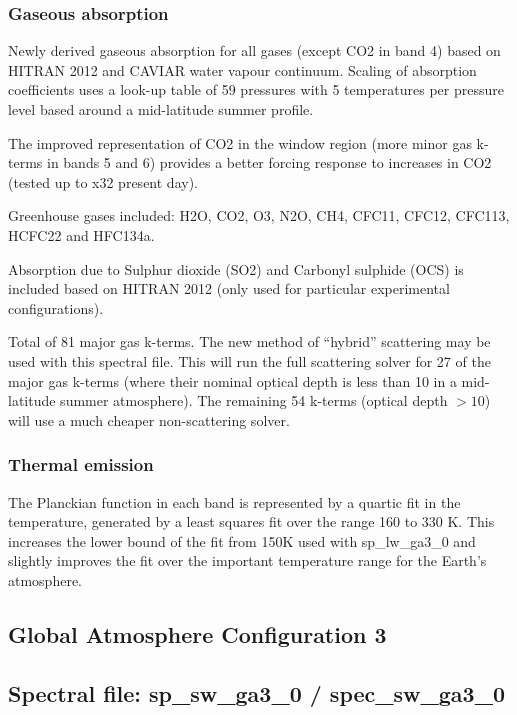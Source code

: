 \subsubsection*{Gaseous absorption}

Newly derived gaseous absorption for all gases (except CO2 in band 4) based on HITRAN 2012 and CAVIAR water vapour continuum. Scaling of absorption coefficients uses a look-up table of 59 pressures with 5 temperatures per pressure level based around a mid-latitude summer profile.

The improved representation of CO2 in the window region (more minor gas k-terms in bands 5 and 6) provides a better forcing response to increases in CO2 (tested up to x32 present day).

Greenhouse gases included: H2O, CO2, O3, N2O, CH4, CFC11, CFC12, CFC113, HCFC22 and HFC134a.

Absorption due to Sulphur dioxide (SO2) and Carbonyl sulphide (OCS) is included based on HITRAN 2012 (only used for particular experimental configurations).

Total of 81 major gas k-terms. The new method of ``hybrid'' scattering may be used with this spectral file. This will run the full scattering solver for 27 of the major gas k-terms (where their nominal optical depth is less than 10 in a mid-latitude summer atmosphere). The remaining 54 k-terms (optical depth $> 10$) will use a much cheaper non-scattering solver.

\subsubsection*{Thermal emission}

The Planckian function in each band is represented by a quartic fit in the temperature, generated by a least squares fit over the range 160 to 330 K. This increases the lower bound of the fit from 150K used with sp\_lw\_ga3\_0 and slightly improves the fit over the important temperature range for the Earth's atmosphere.

\subsection{Global Atmosphere Configuration 3}

\subsection*{Spectral file: sp\_sw\_ga3\_0 / spec\_sw\_ga3\_0}

